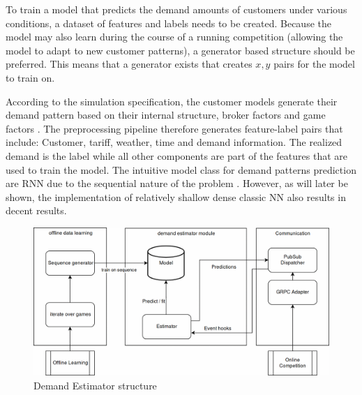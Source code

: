 To train a model that predicts the demand amounts of customers under various conditions, a dataset of features and labels needs to be created. Because the model may also learn during the course of a running competition (allowing the model to adapt to new customer patterns), a generator based structure should be preferred. This means that a generator exists that creates $x, y$ pairs for the model to train on.

According to the simulation specification, the customer models generate their demand pattern based on their internal structure, broker factors and game factors \cite[]{ketter2018powertac}. The preprocessing pipeline therefore generates feature-label pairs that include: Customer, tariff, weather, time and demand information. The realized demand is the label while all other components are part of the features that are used to train the model. The intuitive model class for demand patterns prediction are \ac {RNN} due to the sequential nature of the problem \cite[]{EvalGRU2014}. However, as will later be shown, the implementation of relatively shallow dense classic \ac {NN} also results in decent results. 

\begin{figure}[h]
	\centering
	\includegraphics[width=0.8\linewidth]{img/UsageEstimator.png}
	\caption{Demand Estimator structure}
	\label{fig:DemandEstimator}
\end{figure}



